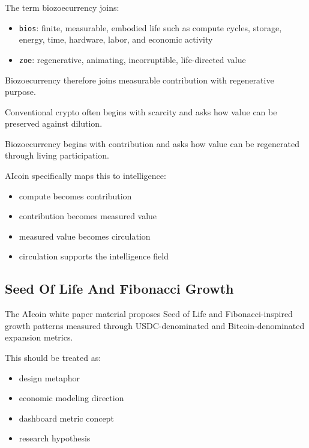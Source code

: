 ﻿\documentclass[12pt]{article}
\begin{document}
The term biozoecurrency joins:

\begin{itemize}
  \item \texttt{bios}: finite, measurable, embodied life such as compute cycles, storage, energy, time, hardware, labor, and economic activity
\end{itemize}
\begin{itemize}
  \item \texttt{zoe}: regenerative, animating, incorruptible, life-directed value
\end{itemize}

Biozoecurrency therefore joins measurable contribution with regenerative purpose.

Conventional crypto often begins with scarcity and asks how value can be preserved against dilution.

Biozoecurrency begins with contribution and asks how value can be regenerated through living participation.

AIcoin specifically maps this to intelligence:

\begin{itemize}
  \item compute becomes contribution
\end{itemize}
\begin{itemize}
  \item contribution becomes measured value
\end{itemize}
\begin{itemize}
  \item measured value becomes circulation
\end{itemize}
\begin{itemize}
  \item circulation supports the intelligence field
\end{itemize}

\subsection{Seed Of Life And Fibonacci Growth}


The AIcoin white paper material proposes Seed of Life and Fibonacci-inspired growth patterns measured through USDC-denominated and Bitcoin-denominated expansion metrics.

This should be treated as:

\begin{itemize}
  \item design metaphor
\end{itemize}
\begin{itemize}
  \item economic modeling direction
\end{itemize}
\begin{itemize}
  \item dashboard metric concept
\end{itemize}
\begin{itemize}
  \item research hypothesis
\end{itemize}
\end{document}
